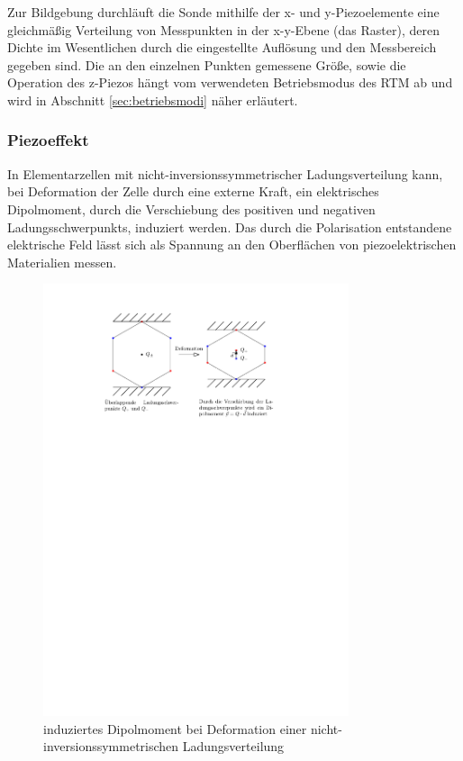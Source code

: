\documentclass[10pt, a4paper]{article}
\begin{document}
Zur Bildgebung durchläuft die Sonde mithilfe der x- und y-Piezoelemente eine gleichmäßig Verteilung von Messpunkten in der x-y-Ebene (das Raster), deren Dichte im Wesentlichen durch die eingestellte Auflösung und den Messbereich gegeben sind.
Die an den einzelnen Punkten gemessene Größe, sowie die Operation des z-Piezos hängt vom verwendeten Betriebsmodus des RTM ab und wird in Abschnitt \ref{sec:betriebsmodi} näher erläutert.


\subsubsection{Piezoeffekt}
\label{sssec:Piezoeffekt}
In Elementarzellen mit nicht-inversionssymmetrischer Ladungsverteilung kann, bei Deformation der Zelle durch eine externe Kraft, ein elektrisches Dipolmoment, durch die Verschiebung des positiven und negativen Ladungsschwerpunkts, induziert werden.
Das durch die Polarisation entstandene elektrische Feld lässt sich als Spannung an den Oberflächen von piezoelektrischen Materialien messen.
\begin{figure}[h]
\centering
\includegraphics[width=0.8\textwidth]{./grafiken/piezoeffekt.pdf}
\caption{induziertes Dipolmoment bei Deformation einer nicht-inversionssymmetrischen Ladungsverteilung}
\end{figure}
\end{document}
